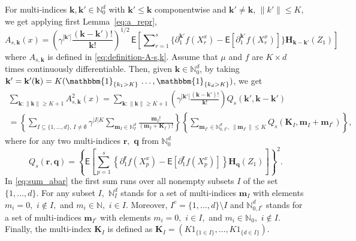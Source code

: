 \documentclass[bj]{imsart}
\def\PE{\mathsf{E}}
\newcommand{\indiacc}[1]{\mathbbm{1}_{\{#1\}}}
\begin{document}
For multi-indices $\mathbf k,\mathbf k'\in\mathbb N_0^d$
with $\mathbf k'\le\mathbf k$ componentwise
and $\mathbf k'\ne\mathbf k$, $\| k' \| \leq K$,
we get applying first Lemma~\ref{eq:a_repr},
\begin{equation*}
A_{s,\mathbf{k}}(x)
=\left(\gamma^{|\mathbf{k}'|}\frac{(\mathbf{k}-\mathbf{k}')!}{\mathbf{k}!}\right)^{1/2}
\,
\PE\left[ \sum\nolimits_{r=1}^{s}\{\partial_{1}^{\mathbf{k}'} f(X^x_r)-\PE[\partial_{1}^{\mathbf{k}'}f(X^x_r)]\}\mathbf{H}_{\mathbf{k}-\mathbf{k}'}(Z_1)\right]
\end{equation*}
where $A_{s,\mathbf{k}}$ is defined in \eqref{eq:definition-A-s,k}.
Assume that $\mu$ and $f$ are $K\times d$ times continuously differentiable.
Then, given $\mathbf k\in\mathbb N_0^d$,
by taking $\mathbf k'= \mathbf k'(\mathbf k)
=K(\indiacc{k_1>K}\,\ldots, \indiacc{k_d>K})$, we get
\begin{multline}
\label{eq:sum_abar}
\sum_{\mathbf{k}\colon\|\mathbf{k}\|\geq K+1}A^2_{s,\mathbf{k}}(x)
=\sum_{\mathbf{k}\colon\|\mathbf{k}\|\geq K+1}\left(\gamma^{|\mathbf{k}'|}\frac{(\mathbf{k}-\mathbf{k}')!}{\mathbf{k}!}\right)Q_s(\mathbf{k}',\mathbf{k}-\mathbf{k}')\\
= \left\{ \sum_{I\subseteq\{1,\ldots,d\},\, I\neq \emptyset}\gamma^{|I|K}\sum_{\mathbf{m}_{I}\in\mathbb{N}_{I}^{d}}\frac{\mathbf{m}_{I}!}{\left(\mathbf{m}_{I}+\mathbf{K}_{I}\right)!} \right\}
\left\{ \sum_{\mathbf{m}_{I^c}\in \mathbb{N}^d_{0,I^c},\,\|\mathbf{m}_{I^c}\|\leq K}Q_s(\mathbf{\mathbf{K}}_{I},\mathbf{m}_{I}+\mathbf{m}_{I^c}) \right\},
\end{multline}
where for any two multi-indices \(\mathbf{r},\) \(\mathbf{q}\) from \(\mathbb{N}_0^d\)
\begin{equation*}
Q_s(\mathbf{r},\mathbf{q})
=
\left\{\PE\left[\sum_{p=1}^{s}\left\{\partial_{1}^{\mathbf r}f\left(X^x_{p}\right)-\PE\left[\partial_{1}^{\mathbf r}f\left(X^x_{p}\right)\right]\right\}\mathbf{H}_{\mathbf{q}}(Z_{1})\right]\right\}^{2}.
\end{equation*}
In \eqref{eq:sum_abar} the first sum runs over all nonempty subsets $I$ of the set $\{1,\ldots,d\}.$
For any subset $I,$ $\mathbb{N}_{I}^{d}$ stands for a set
of multi-indices $\mathbf{m}_{I}$ with elements $m_{i}=0,$ $i\not\in I,$
and $m_{i}\in\mathbb{N},$  $i\in I.$ Moreover, \(I^c=\{1,\ldots,d\}\setminus I\) and \(\mathbb{N}^d_{0,I^c}\) stands for a set
of multi-indices $\mathbf{m}_{I^c}$ with elements $m_{i}=0,$ $i\in I,$
and $m_{i}\in\mathbb{N}_0,$  $i\not\in I.$ Finally, the multi-index \(\mathbf{K}_I\) is defined as $\mathbf{\mathbf{K}}_{I}=(K1_{\{1\in I\}},\ldots,K1_{\{d\in I\}}).$
\end{document}
